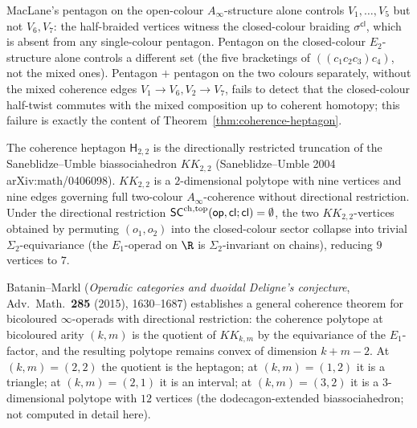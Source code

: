 \begin{remark}
\label{rem:pentagon-insufficient}%
%
MacLane's pentagon on the open-colour $A_\infty$-structure alone
controls $V_1,\ldots,V_5$ but not $V_6, V_7$: the half-braided
vertices witness the closed-colour braiding
$\sigma^{\mathsf{cl}}$, which is absent from any single-colour
pentagon. Pentagon on the closed-colour $E_2$-structure alone
controls a different set (the five bracketings of
$((c_1 c_2 c_3) c_4)$, not the mixed ones). Pentagon $+$ pentagon on
the two colours separately, without the mixed coherence edges
$V_1\to V_6, V_2\to V_7$, fails to detect that the closed-colour
half-twist commutes with the mixed composition up to coherent
homotopy; this failure is exactly the content of
Theorem~\ref{thm:coherence-heptagon}.
\end{remark}

\begin{remark}
\label{rem:saneblidze-umble-relation}%
%
%
The coherence heptagon $\mathsf{H}_{2,2}$ is the directionally
restricted truncation of the Saneblidze--Umble biassociahedron
$KK_{2,2}$ (Saneblidze--Umble 2004 arXiv:math/0406098). $KK_{2,2}$
is a $2$-dimensional polytope with nine vertices and nine edges
governing full two-colour $A_\infty$-coherence without
directional restriction. Under the directional restriction
$\mathsf{SC}^{\mathrm{ch},\mathrm{top}}(\mathsf{op},\mathsf{cl};\mathsf{cl}) = \emptyset$, the
two $KK_{2,2}$-vertices obtained by permuting
$(o_1, o_2)$ into the closed-colour sector collapse into trivial
$\Sigma_2$-equivariance (the $E_1$-operad on $\R$ is
$\Sigma_2$-invariant on chains), reducing $9$ vertices to $7$.

Batanin--Markl (\emph{Operadic categories and duoidal Deligne's
conjecture}, Adv.~Math.\ \textbf{285} (2015), 1630--1687)
establishes a general
coherence theorem for bicoloured $\infty$-operads with
directional restriction: the coherence polytope at bicoloured
arity $(k, m)$ is the quotient of $KK_{k,m}$ by the
equivariance of the $E_1$-factor, and the resulting polytope
remains convex of dimension $k + m - 2$. At $(k, m) = (2, 2)$
the quotient is the heptagon; at $(k, m) = (1, 2)$ it is a
triangle; at $(k, m) = (2, 1)$ it is an interval; at
$(k, m) = (3, 2)$ it is a $3$-dimensional polytope with $12$
vertices (the dodecagon-extended biassociahedron; not computed
in detail here).
\end{remark}

